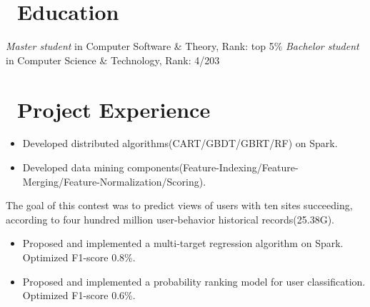 \documentclass{resume}
\begin{document}


 
\section{\faGraduationCap\ Education}
\textit{Master student} in Computer Software \& Theory, Rank: top 5\%
\textit{Bachelor student} in Computer Science \& Technology, Rank: 4/203

\section{\faUsers\ Project Experience}
\begin{itemize}
  \item  Developed distributed algorithms(CART/GBDT/GBRT/RF) on Spark.
  \item Developed data mining components(Feature-Indexing/Feature-Merging/Feature-Normalization/Scoring).
\end{itemize}

The goal of this contest was to predict views of users with ten sites succeeding, according to four hundred million user-behavior historical records(25.38G).
\begin{itemize}
  \item Proposed and implemented a multi-target regression algorithm on Spark. Optimized F1-score 0.8\%.
  \item Proposed and implemented a probability ranking model for user classification. Optimized F1-score  0.6\%.
\end{itemize}
\end{document}
